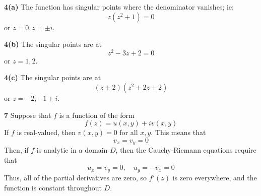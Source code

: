 \documentclass{article}
\begin{document}
\textbf{4(a)}
The function has singular points where the denominator vanishes; ie:
\[
	z(z^2 + 1) = 0
\]
or $z = 0, z = \pm i$.

\textbf{4(b)}
The singular points are at
\[
	z^2 - 3z + 2 = 0
\]
or $z = 1, 2$.

\textbf{4(c)}
The singular points are at
\[
	(z + 2)(z^2 + 2z + 2)
\]
or $z = -2, -1 \pm i$.

\textbf{7}
Suppose that $f$ is a function of the form
\[
	f(z) = u(x, y) + iv(x, y)
\]
If $f$ is real-valued, then $v(x, y) = 0$ for all $x, y$. This means that
\[
	v_x = v_y = 0
\]
Then, if $f$ is analytic in a domain $D$, then the Cauchy-Riemann equations require that
\[
	u_x = v_y = 0,	\quad	u_y = -v_x = 0
\]
Thus, all of the partial derivatives are zero, so $f'(z)$ is zero everywhere, and the function is constant throughout $D$.
\end{document}
